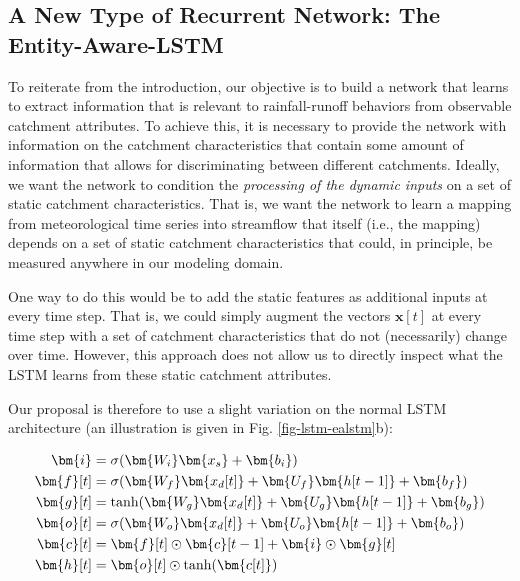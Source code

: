 \subsection{A New Type of Recurrent Network: The Entity-Aware-LSTM}\label{sec-ealstm}

To reiterate from the introduction, our objective is to build a network that learns to extract information that is relevant to rainfall-runoff behaviors from observable catchment attributes. To achieve this, it is necessary to provide the network with information on the catchment characteristics that contain some amount of information that allows for discriminating between different catchments. Ideally, we want the network to condition the \textit{processing of the dynamic inputs} on a set of static catchment characteristics. That is, we want the network to learn a mapping from meteorological time series into streamflow that itself (i.e., the mapping) depends on a set of static catchment characteristics that could, in principle, be measured anywhere in our modeling domain.

One way to do this would be to add the static features as additional inputs at every time step. That is, we could simply augment the vectors $\bm{x}[t]$ at every time step with a set of catchment characteristics that do not (necessarily) change over time. However, this approach does not allow us to directly inspect what the \gls{LSTM} learns from these static catchment attributes.

Our proposal is therefore to use a slight variation on the normal \gls{LSTM} architecture (an illustration is given in Fig. \ref{fig-lstm-ealstm}b):

\begin{align}
    \bm{i} &= \sigma(\bm{W_i}\bm{x_s} + \bm{b_i}) \label{eq-ealstm-inputgate}\\
    \bm{f}[t] &= \sigma(\bm{W_f}\bm{x_d[t]} + \bm{U_f}\bm{h[t-1]} + \bm{b_f}) \label{eq-ealstm-forgetgate}\\
    \bm{g}[t] &= \textup{tanh}(\bm{W_g}\bm{x_d[t]} + \bm{U_g}\bm{h[t-1]} + \bm{b_g}) \label{eq-ealstm-cellinput}\\ 
    \bm{o}[t] &= \sigma(\bm{W_o}\bm{x_d[t]} + \bm{U_o}\bm{h[t-1]} + \bm{b_o}) \label{eq-ealstm-outputgate}\\
    \bm{c}[t] &= \bm{f}[t] \odot \bm{c}[t-1] + \bm{i} \odot \bm{g}[t] \label{eq-ealstm-cellstate}\\
    \bm{h}[t] &= \bm{o}[t] \odot \textup{tanh}(\bm{c[t]})\label{eq-ealstm-hidden}
\end{align}

